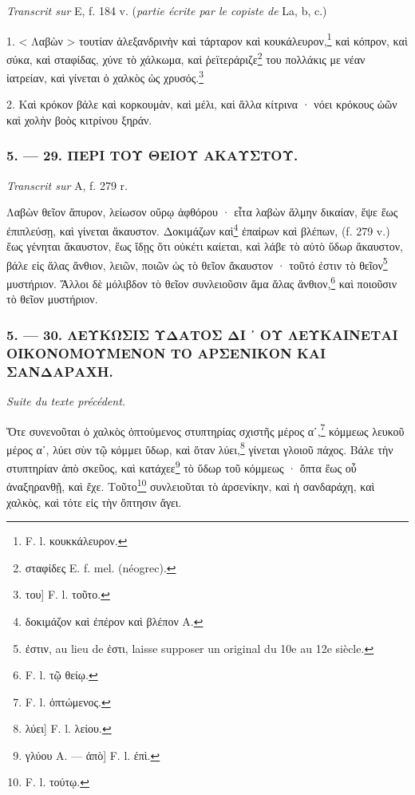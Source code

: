 \documentclass[a4paper, 11pt, oneside, polutonikogreek, french]{article}
\begin{document}
\emph{Transcrit sur} E, f. 184 v. (\emph{partie écrite par le copiste de} La, b, c.)

1. < Λαβὼν > τουτίαν ἀλεξανδρινὴν καὶ τάρταρον καὶ κουκάλευρον,\footnote{F. l. κουκκάλευρον.} καὶ κόπρον, καὶ σύκα, καὶ σταφίδας, χύνε τὸ χάλκωμα, καὶ ῥεϊτεράριζε\footnote{σταφίδες E. f. mel. (néogrec).} του πολλάκις με νέαν ἰατρείαν, καὶ γίνεται ὁ χαλκὸς ὡς χρυσός.\footnote{του] F. l. τοῦτο.}

2. Καὶ κρόκον βάλε καὶ κορκουμὰν, καὶ μέλι, καὶ ἄλλα κίτρινα · νόει κρόκους ὠῶν καὶ χολὴν βοὸς κιτρίνου ξηράν.

\bigskip
\centerline{\EightStarTaper}
\centerline{\EightStarTaper\EightStarTaper}
\bigskip

\subsubsection{5. --- 29. ΠΕΡΙ ΤΟΥ ΘΕΙΟΥ ΑΚΑΥΣΤΟΥ.}

\emph{Transcrit sur} A, f. 279 r.

Λαβὼν θεῖον ἄπυρον, λείωσον οὔρῳ ἀφθόρου · εἶτα λαβὼν ἅλμην δικαίαν, ἕψε ἕως ἐπιπλεύσῃ, καὶ γίνεται ἄκαυστον. Δοκιμάζων καὶ\footnote{δοκιμάζον καὶ ἐπέρον καὶ βλέπον A.} ἐπαίρων καὶ βλέπων, (f. 279 v.) ἕως γένηται ἄκαυστον, ἕως ἴδῃς ὅτι οὐκέτι καίεται, καὶ λάβε τὸ αὐτὸ ὕδωρ ἄκαυστον, βάλε εἰς ἅλας ἄνθιον, λειῶν, ποιῶν ὡς τὸ θεῖον ἄκαυστον · τοῦτό ἐστιν τὸ θεῖον\footnote{ἐστιν, au lieu de ἐστι, laisse supposer un original du 10e au 12e siècle.} μυστήριον. Ἄλλοι δὲ μόλιβδον τὸ θεῖον συνλειοῦσιν ἅμα ἅλας ἄνθιον,\footnote{F. l. τῷ θείῳ.} καὶ ποιοῦσιν τὸ θεῖον μυστήριον.

\bigskip
\centerline{\EightStarTaper}
\centerline{\EightStarTaper\EightStarTaper}
\bigskip

\subsubsection{5. --- 30. ΛΕΥΚΩΣΙΣ ΥΔΑΤΟΣ ΔΙ ᾽ ΟΥ ΛΕΥΚΑΙΝΕΤΑΙ ΟΙΚΟΝΟΜΟΥΜΕΝΟΝ ΤΟ ΑΡΣΕΝΙΚΟΝ ΚΑΙ ΣΑΝΔΑΡΑΧΗ.}

\emph{Suite du texte précédent.}

Ὅτε συνενοῦται ὁ χαλκὸς ὀπτούμενος στυπτηρίας σχιστῆς μέρος αʹ,\footnote{F. l. ὀπτώμενος.} κόμμεως λευκοῦ μέρος αʹ, λύει σὺν τῷ κόμμει ὕδωρ, καὶ ὅταν λύει,\footnote{λύει] F. l. λείου.} γίνεται γλοιοῦ πάχος. Βάλε τὴν στυπτηρίαν ἀπὸ σκεῦος, καὶ κατάχεε\footnote{γλύου A. --- ἀπὸ] F. l. ἐπὶ.} τὸ ὕδωρ τοῦ κόμμεως · ὄπτα ἕως οὗ ἀναξηρανθῇ, καὶ ἔχε. Τοῦτο\footnote{F. l. τούτῳ.} συνλειοῦται τὸ ἀρσενίκην, καὶ ἡ σανδαράχη, καὶ χαλκὸς, καὶ τότε εἰς τὴν ὄπτησιν ἄγει.
\end{document}
